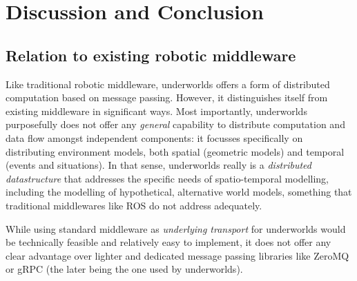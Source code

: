 \documentclass[letterpaper, 10pt, conference]{ieeeconf}
\newcommand{\uwds}{{\sc underworlds}\xspace}
\begin{document}
%
%

\section{Discussion and Conclusion}

\subsection{Relation to existing robotic middleware}

Like traditional robotic middleware, \uwds offers a form of distributed
computation based on message passing. However, it distinguishes itself from
existing middleware in significant ways. Most importantly, \uwds purposefully
does not offer any \emph{general} capability to distribute computation and data
flow amongst independent components: it focusses specifically on distributing
environment models, both spatial (geometric models) and temporal (events and
situations). In that sense, \uwds really is a \emph{distributed datastructure}
that addresses the specific needs of spatio-temporal modelling,
including the modelling of hypothetical, alternative world models, something
that traditional middlewares like ROS do not address adequately.

While using standard middleware as \emph{underlying transport} for \uwds would be
technically feasible and relatively easy to implement, it does not offer any
clear advantage over lighter and dedicated message passing libraries like ZeroMQ
or gRPC (the later being the one used by \uwds).
\end{document}
